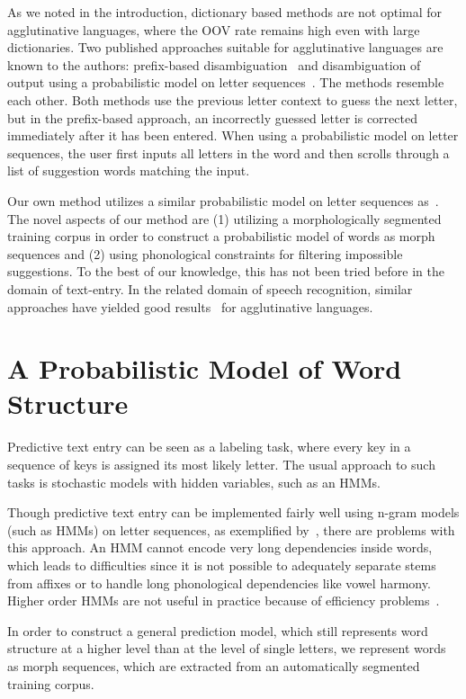 \documentclass{llncs}
\begin{document}
As we noted in the introduction, dictionary based methods are not
optimal for agglutinative languages, where the OOV rate remains high
even with large dictionaries. Two published approaches suitable for
agglutinative languages are known to the authors: prefix-based
disambiguation~\cite{Mackenzie01letterwise:prefix-based} and
disambiguation of output using a probabilistic model on letter
sequences~\cite{Tantug:2010}. The methods resemble each other. Both
methods use the previous letter context to guess the next letter, but
in the prefix-based approach, an incorrectly guessed letter is
corrected immediately after it has been entered. When using a
probabilistic model on letter sequences, the user first inputs all
letters in the word and then scrolls through a list of suggestion
words matching the input.

Our own method utilizes a similar probabilistic model on letter
sequences as~\cite{Tantug:2010}. The novel aspects of our method are
(1) utilizing a morphologically segmented training corpus in order to
construct a probabilistic model of words as morph sequences and (2)
using phonological constraints for filtering impossible
suggestions. To the best of our knowledge, this has not been tried
before in the domain of text-entry. In the related domain of speech
recognition, similar approaches have yielded good
results~\cite{Creutz_morph-basedspeech} for agglutinative languages.

\section{A Probabilistic Model of Word Structure}\label{model}

Predictive text entry can be seen as a labeling task, where every key
in a sequence of keys is assigned its most likely letter. The usual
approach to such tasks is stochastic models with hidden variables,
such as an HMMs.

Though predictive text entry can be implemented fairly well using
n-gram models (such as HMMs) on letter sequences, as exemplified
by~\cite{Tantug:2010}, there are problems with this approach. An HMM
cannot encode very long dependencies inside words, which leads to
difficulties since it is not possible to adequately separate stems
from affixes or to handle long phonological dependencies like vowel
harmony. Higher order HMMs are not useful in practice because of
efficiency problems~\cite{Tantug:2010}.

In order to construct a general prediction model, which still
represents word structure at a higher level than at the level of
single letters, we represent words as morph sequences, which are
extracted from an automatically segmented training corpus.
\end{document}
